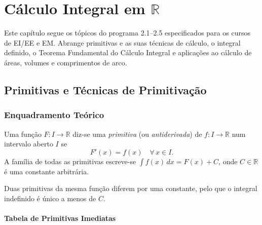 
\chapter{Cálculo Integral em \texorpdfstring{$\mathbb{R}$}{R}}

Este capítulo segue os tópicos do programa 2.1--2.5 especificados para os
cursos de EI/EE e EM. Abrange primitivas e as suas técnicas de cálculo,
o integral definido, o Teorema Fundamental do Cálculo Integral e
aplicações ao cálculo de áreas, volumes e comprimentos de arco.

\section{Primitivas e Técnicas de Primitivação}

\subsection{Enquadramento Teórico}

\begin{defbox}[title={Primitiva (Antiderivada)}]
  Uma função $F : I \to \mathbb{R}$ diz-se uma \emph{primitiva} (ou
  \emph{antiderivada}) de $f : I \to \mathbb{R}$ num intervalo aberto $I$ se
  \[
    F'(x) = f(x) \quad \forall\, x \in I.
  \]
  A família de todas as primitivas escreve-se $\displaystyle\int f(x)\,dx = F(x)+C$,
  onde $C \in \mathbb{R}$ é uma constante arbitrária.
\end{defbox}

\begin{notebox}
  Duas primitivas da mesma função diferem por uma constante, pelo que o
  integral indefinido é único a menos de $C$.
\end{notebox}

\subsubsection*{Tabela de Primitivas Imediatas}

